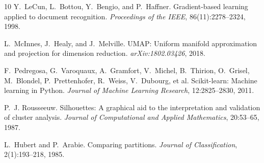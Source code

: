 \documentclass{article}
\begin{document}
\begin{thebibliography}{10}
Y.~LeCun, L.~Bottou, Y.~Bengio, and P.~Haffner.
\newblock Gradient-based learning applied to document recognition.
\newblock \emph{Proceedings of the IEEE}, 86(11):2278--2324, 1998.

L.~McInnes, J.~Healy, and J.~Melville.
\newblock UMAP: Uniform manifold approximation and projection for
dimension reduction.
\newblock \emph{arXiv:1802.03426}, 2018.

F.~Pedregosa, G.~Varoquaux, A.~Gramfort, V.~Michel, B.~Thirion,
O.~Grisel, M.~Blondel, P.~Prettenhofer, R.~Weiss, V.~Dubourg, et al.
\newblock Scikit-learn: Machine learning in Python.
\newblock \emph{Journal of Machine Learning Research}, 12:2825--2830,
2011.

P.~J. Rousseeuw.
\newblock Silhouettes: A graphical aid to the interpretation and
validation of cluster analysis.
\newblock \emph{Journal of Computational and Applied Mathematics},
20:53--65, 1987.

L.~Hubert and P.~Arabie.
\newblock Comparing partitions.
\newblock \emph{Journal of Classification}, 2(1):193--218, 1985.

\end{thebibliography}
\end{document}
